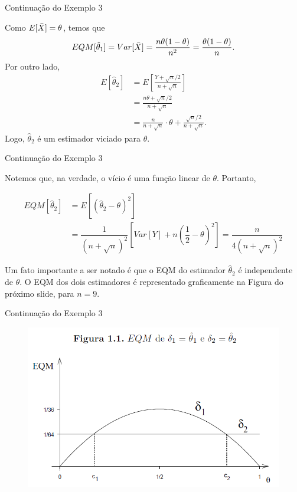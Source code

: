 \documentclass[12pt]{beamer}
\begin{document}
\begin{frame}{Continuação do Exemplo 3}
\begin{block}{}
\justifying
Como $E[\Bar{X}] = \theta$, temos que
$$EQM[\hat{\theta}_1]=Var[\Bar{X}]=\dfrac{n\theta(1-\theta)}{n^2}=\dfrac{\theta(1-\theta)}{n}.$$
Por outro lado,
\begin{align*}
E[\hat{\theta}_2] &= E\left[\frac{Y + \sqrt{n}/2}{n + \sqrt{n}}\right] \\
&= \frac{n\theta + \sqrt{n}/2}{n + \sqrt{n}} \\
&= \frac{n}{n + \sqrt{n}} \cdot \theta + \frac{\sqrt{n}/2}{n + \sqrt{n}}.
\end{align*}
Logo, $\hat{\theta}_2$ é um estimador viciado para $\theta$. 
\end{block}
\end{frame}

\begin{frame}{Continuação do Exemplo 3}
\begin{block}{}
\justifying
Notemos que, na verdade, o vício é uma função linear de $\theta$. Portanto,

\begin{align*}
EQM[\hat{\theta}_2] &= E[(\hat{\theta}_2 - \theta)^2]\\ &= \dfrac{1}{(n+\sqrt{n})^2} \left[ Var[Y] + n \left(\dfrac{1}{2} - \theta \right)^2 \right] = \dfrac{n}{4(n+\sqrt{n})^2}
\end{align*}

Um fato importante a ser notado é que o EQM do estimador $\hat{\theta}_2$ é independente de $\theta$. O EQM dos dois estimadores é representado graficamente na Figura do próximo slide, para $n=9$.
\end{block}
\end{frame}

\begin{frame}{Continuação do Exemplo 3}
\begin{block}{}
\justifying
\begin{figure}[H]
    \centering
    \includegraphics[scale=0.5]{figs/EQM.png}
    \label{fig1}
\end{figure}
\end{block}
\end{frame}
\end{document}
